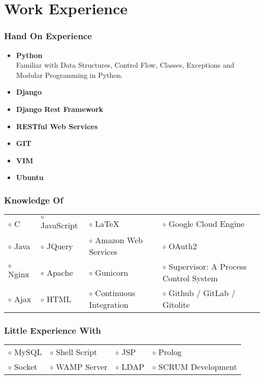 \documentclass[10pt]{article}
\begin{document}
\section*{Work Experience}

\subsubsection*{Hand On Experience}

\begin{itemize}
 \item \textbf{Python} \\
 Familiar with Data Structures, Control Flow, Classes, Exceptions and Modular Programming in Python.
 \item \textbf{Django}
 \item \textbf{Django Rest Framework}
 \item \textbf{RESTful Web Services}
 \item \textbf{GIT}
 \item \textbf{VIM}
 \item \textbf{Ubuntu}
\end{itemize}

\subsubsection*{Knowledge Of}

\begin{tabular}{l l l l}
 $\circ$ C &
 $\circ$ JavaScript &
 $\circ$ \LaTeX{} &
 $\circ$ Google Cloud Engine \\
 $\circ$ Java &
 $\circ$ JQuery &
 $\circ$ Amazon Web Services &
 $\circ$ OAuth2 \\
 $\circ$ Nginx &
 $\circ$ Apache &
 $\circ$ Gunicorn &
 $\circ$ Supervisor: A Process Control System \\
 $\circ$ Ajax &
 $\circ$ HTML &
 $\circ$ Continuous Integration &
 $\circ$ Github / GitLab / Gitolite \\
\end{tabular}

\subsubsection*{Little Experience With}

\begin{tabular}{l l l l}
 $\circ$ MySQL &
 $\circ$ Shell Script &
 $\circ$ JSP &
 $\circ$ Prolog \\
 $\circ$ Socket &
 $\circ$ WAMP Server &
 $\circ$ LDAP &
 $\circ$ SCRUM Development \\
\end{tabular}
\end{document}
